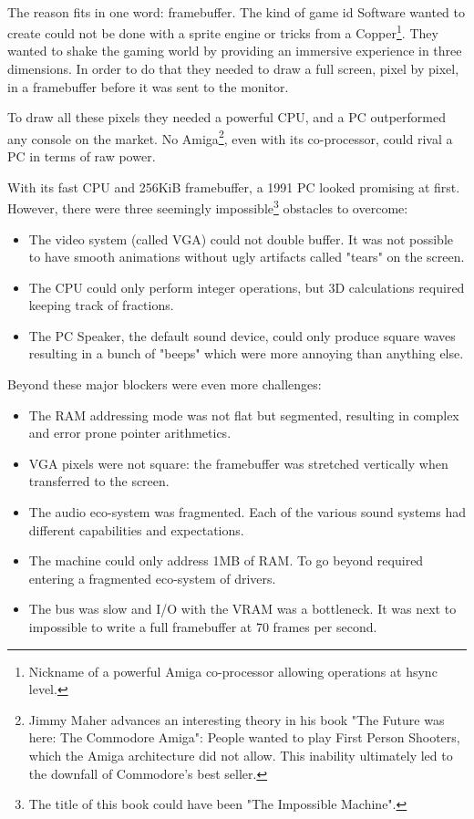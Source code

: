 \\
The reason fits in one word: framebuffer. The kind of game id Software wanted to create could not be done with a sprite engine or tricks from a Copper\footnote{Nickname of a powerful Amiga co-processor allowing operations at hsync level.}. They wanted to shake the gaming world by providing an immersive experience in three dimensions. In order to do that they needed to draw a full screen, pixel by pixel, in a framebuffer before it was sent to the monitor. \\
\par
To draw all these pixels they needed a powerful CPU, and a PC outperformed any console on the market. No Amiga\footnote{Jimmy Maher advances an interesting theory in his book "The Future was here: The Commodore Amiga": People wanted to play First Person Shooters, which the Amiga architecture did not allow. This inability ultimately led to the downfall of Commodore's best seller.}, even with its co-processor, could rival a PC in terms of raw power.
\par


 
With its fast CPU and 256KiB framebuffer, a 1991 PC looked promising at first. However, there were three seemingly impossible\footnote{The title of this book could have been "The Impossible Machine".} obstacles to overcome:
\begin{itemize}
\item The video system (called VGA) could not double buffer. It was not possible to have smooth animations without ugly artifacts called "tears" on the screen.
\item The CPU could only perform integer operations, but 3D calculations required keeping track of fractions.
\item The PC Speaker, the default sound device, could only produce square waves resulting in a bunch of "beeps" which were more annoying than anything else.
\end{itemize}
Beyond these major blockers were even more challenges:
\begin{itemize}
\item The RAM addressing mode was not flat but segmented, resulting in complex and error prone pointer arithmetics.
\item VGA pixels were not square: the framebuffer was stretched vertically when
transferred to the screen.
\item The audio eco-system was fragmented. Each of the various sound systems had different capabilities and expectations.
\item The machine could only address 1MB of RAM. To go beyond required entering a fragmented eco-system of drivers.
\item The bus was slow and I/O with the VRAM was a bottleneck. It was next to impossible to write a full framebuffer at 70 frames per second.
\end{itemize}

